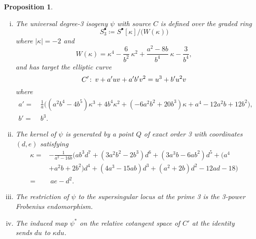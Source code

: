 \documentclass{gtpart}
\newtheorem{prop}[thm]{Proposition}
\theoremstyle{definition}
\theoremstyle{remark}
\def\co{\colon\thinspace}
\newcommand{\K}{\kappa}
\newcommand{\s}{S^\bullet}
\begin{document}
\begin{prop}
\label{prop:isog}
 \mbox{}
 \begin{enumerate}[(i)]
  \item \label{isog(i)} The universal degree-3 isogeny $\psi$ with 
  source $C$ is defined over the graded ring 
  \[
   \s_3 \coloneqq \s [\K] \big/ \big( W(\K) \big) 
  \]
  where $|\K| = -2$ and 
  \begin{equation}
  \label{W}
   W(\K) = \K^4 - \frac{6}{b^2} ~ \K^2 + \frac{a^2 - 8 b}{b^4} ~ \K - \frac{3}{b^4}, 
  \end{equation}
  and has target the elliptic curve 
  \[
   C' \co v + a' u v + a' b' v^2 = u^3 + b' u^2 v 
  \]
  where 
  \begin{equation*}
  \begin{split}
   a' = & ~ \frac{1}{a} \big( (a^2 b^4 - 4 b^5) \K^3 + 4 b^4 \K^2 + (-6 a^2 b^2 + 20 b^3) \K + a^4 - 12 a^2 b + 12 b^2 \big), \\
   b' = & ~ b^3.  
  \end{split}
  \end{equation*}

  \item \label{isog(ii)} The kernel of $\psi$ is generated by a point 
  $Q$ of exact order 3 with coordinates $(d,e)$ satisfying 
  \begin{equation}
  \label{K}
  \begin{split}
   \K = & -\frac{1}{a^2 - 16 b} \big( a b^3 d^7 + (3 a^2 b^2 - 2 b^3) d^6 + (3 a^3 b - 6 a b^2) d^5 + (a^4 \\
        & + a^2 b + 2 b^2) d^4 + (4 a^3 - 15 a b) d^3 + (a^2 + 2 b) d^2 - 12 a d - 18 \big) \\
      = & ~ a e - d^2.  
  \end{split}
  \end{equation}

  \item \label{isog(iii)} The restriction of $\psi$ to the supersingular 
  locus at the prime 3 is the 3-power Frobenius endomorphism.  

  \item \label{isog(iv)} The induced map $\psi^*$ on the relative 
  cotangent space of $C'$ at the identity sends $du$ to $\K du$.  
 \end{enumerate}
\end{prop}
\end{document}
